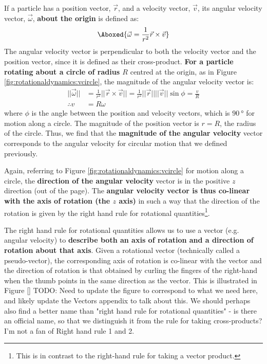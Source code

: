 If a particle has a position vector, $\vec r$, and a velocity vector, $\vec v$, its angular velocity vector, $\vec \omega$, \textbf{about the origin} is defined as:
\begin{align}
\Aboxed{\vec \omega = \frac{1}{r^2} \vec r \times \vec v}
\end{align}
The angular velocity vector is perpendicular to both the velocity vector and the position vector, since it is defined as their cross-product. \textbf{For a particle rotating about a circle of radius $R$} centred at the origin, as in Figure \ref{fig:rotationaldynamics:vcircle}, the magnitude of the angular velocity vector is:
\begin{align*}
||\vec\omega|| &=\frac{1}{r^2} || \vec r \times \vec v||= \frac{1}{r^2}||\vec r|| ||\vec v||\sin\phi= \frac{v}{R}\\
\therefore v &= R\omega
\end{align*}
where $\phi$ is the angle between the position and velocity vectors, which is $\SI{90}{\degree}$ for motion along a circle. The magnitude of the position vector is $r=R$, the radius of the circle. Thus, we find that the \textbf{magnitude of the angular velocity} vector corresponds to the angular velocity for circular motion that we defined previously.

Again, referring to Figure \ref{fig:rotationaldynamics:vcircle} for motion along a circle, the \textbf{direction of the angular velocity} vector is in the positive $z$ direction (out of the page). The \textbf{angular velocity vector is thus co-linear with the axis of rotation (the $z$ axis)} in such a way that the direction of the rotation is given by the right hand rule for rotational quantities\footnote{This is in contrast to the right-hand rule for taking a vector product.}. 

The right hand rule for rotational quantities allows us to use a vector (e.g. angular velocity) to \textbf{describe both an axis of rotation and a direction of rotation about that axis}. Given a rotational vector (technically called a pseudo-vector), the corresponding axis of rotation is co-linear with the vector and the direction of rotation is that obtained by curling the fingers of the right-hand when the thumb points in the same direction as the vector. This is illustrated in Figure \ref{}
TODO: Need to update the figure to correspond to what we need here, and likely update the Vectors appendix to talk about this. We should perhaps also find a better name than "right hand rule for rotational quantities" - is there an official name, so that we distinguish it from the rule for taking cross-products? I'm not a fan of Right hand rule 1 and 2.

